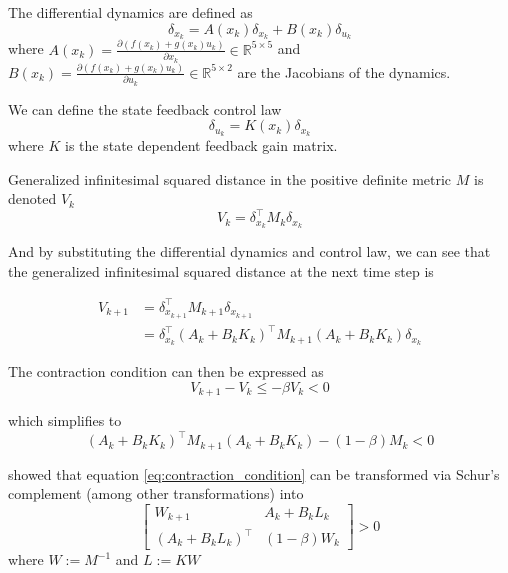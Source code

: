 \documentclass[journal]{IEEEtran}
\begin{document}
The differential dynamics are defined as
\begin{equation}
    \delta_{x_k} = A(x_k)\delta_{x_k} + B(x_k)\delta_{u_k}
\end{equation}
where $A(x_k) = \frac{\partial (f(x_k) + g(x_k)u_k)}{\partial x_k} \in \mathbb{R}^{5 \times 5}$ and $B(x_k) = \frac{\partial (f(x_k) + g(x_k)u_k)}{\partial u_k} \in \mathbb{R}^{5 \times 2}$ are the Jacobians of the dynamics.

We can define the state feedback control law
\begin{equation}
	\label{eq:delta_control_law}
    \delta_{u_k} = K(x_k)\delta_{x_k}
\end{equation}
where $K$ is the state dependent feedback gain matrix.

Generalized infinitesimal squared distance in the positive definite metric $M$ is denoted $V_k$
\begin{equation}
    V_k = \delta^\top_{x_k} M_{k} \delta_{x_k}
\end{equation}

And by substituting the differential dynamics and control law, we can see that the generalized infinitesimal squared distance at the next time step is

\begin{equation}
	\begin{aligned}
	V_{k+1} & = \delta^\top_{x_{k+1}} M_{k+1} \delta_{x_{k+1}} \\
	& = \delta^\top_{x_k} (A_k + B_k K_k)^\top M_{k+1} (A_k + B_k K_k)\delta_{x_k}
	\end{aligned}
\end{equation}

The contraction condition can then be expressed as
\begin{equation}
	V_{k+1} - V_k \leq 
	- \beta V_k <
	0
\end{equation}

which simplifies to
\begin{equation}
	\label{eq:contraction_condition}
	(A_k + B_k K_k)^\top M_{k+1} (A_k + B_k K_k) - (1 - \beta) M_k < 0
\end{equation}

\autocite{weiControlContractionMetric2021} showed that equation \ref{eq:contraction_condition} can be transformed via Schur's complement (among other transformations) into
\begin{equation}
	\label{eq:contraction_condition_schur}
	\begin{bmatrix}
		W_{k+1} & A_k + B_k L_k \\
		(A_k + B_k L_k)^\top & (1 - \beta) W_k
	\end{bmatrix} > 0
\end{equation}
where $W := M^{-1}$ and $L := KW$
\end{document}
